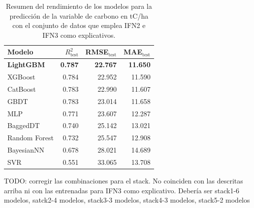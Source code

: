 \begin{table}
    \centering
    \caption{Resumen del rendimiento de los modelos para la predicción de la variable de carbono en tC/ha con el conjunto de datos que emplea IFN2 e IFN3 como explicativos.}
    \label{tab:resultadosmodelosbaseTHA}
    \begin{tabular}{lrrr}
        \toprule
        Modelo            & $R^2_{\text{test}}$ & RMSE$_{\text{test}}$ & MAE$_{\text{test}}$ \\
        \midrule
        \textbf{LightGBM} & \textbf{0.787}      & \textbf{22.767}      & \textbf{11.650}     \\
        XGBoost           & 0.784               & 22.952               & 11.590              \\
        CatBoost          & 0.783               & 22.990               & 11.607              \\
        GBDT              & 0.783               & 23.014               & 11.658              \\
        MLP               & 0.771               & 23.607               & 12.287              \\
        BaggedDT          & 0.740               & 25.142               & 13.021              \\
        Random Forest     & 0.732               & 25.547               & 12.908              \\
        BayesianNN        & 0.678               & 28.021               & 14.689              \\
        SVR               & 0.551               & 33.065               & 13.708              \\
        \bottomrule
    \end{tabular}
\end{table}

TODO: corregir las combinaciones para el stack. No coinciden con las descritas arriba ni con las entrenadas para IFN3 como explicativo. Debería ser stack1-6 modelos, satck2-4 modelos, stack3-3 modelos, stack4-3 modelos, stack5-2 modelos

